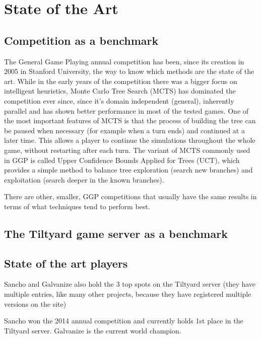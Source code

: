 
\chapter{State of the Art}
\label{chapter:state_of_the_art}

\section{Competition as a benchmark}
The General Game Playing annual competition has been, since its creation in 2005 in Stanford University, the way to know which methods are the state of the art.
While in the early years of the competition there was a bigger focus on intelligent heuristics, Monte Carlo Tree Search (MCTS) has dominated the competition ever since, since it’s domain independent (general), inherently parallel and has shown better performance in most of the tested games. One of the most important features of MCTS is that the process of building the tree can be paused when necessary (for example when a turn ends) and continued at a later time. This allows a player to continue the simulations throughout the whole game, without restarting after each turn.
The variant of MCTS commonly used in GGP is called Upper Confidence Bounds Applied for Trees (UCT), which provides a simple method to balance tree exploration (search new branches) and exploitation (search deeper in the known branches).

There are other, smaller, \gls{GGP} competitions that usually have the same results in terms of what techniques tend to perform best.

\section{The Tiltyard game server as a benchmark}

\section{State of the art players}

Sancho and Galvanize also hold the 3 top spots on the Tiltyard server (they have multiple entries, like many other projects, because they have registered multiple versions on the site)

Sancho won the 2014 annual competition and currently holds 1st place in the Tiltyard server.
Galvanize is the current world champion.



